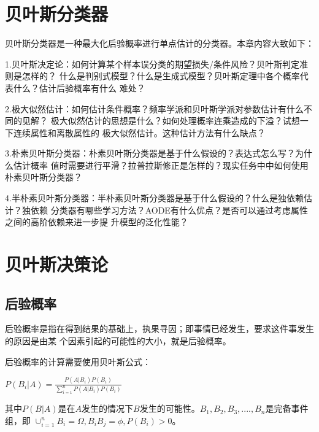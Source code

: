 \documentclass[UTF8]{ctexart}
\begin{document}
\newpage
\tableofcontents
\newpage
\Large{
\section{贝叶斯分类器}
贝叶斯分类器是一种最大化后验概率进行单点估计的分类器。本章内容大致如下：\par
1.贝叶斯决定论：如何计算某个样本误分类的期望损失/条件风险？贝叶斯判定准则是怎样的？
什么是判别式模型？什么是生成式模型？贝叶斯定理中各个概率代表什么？估计后验概率有什么
难处？\par
2.极大似然估计：如何估计条件概率？频率学派和贝叶斯学派对参数估计有什么不同的见解？
极大似然估计的思想是什么？如何处理概率连乘造成的下溢？试想一下连续属性和离散属性的
极大似然估计。这种估计方法有什么缺点？\par
3.朴素贝叶斯分类器：朴素贝叶斯分类器是基于什么假设的？表达式怎么写？为什么估计概率
值时需要进行平滑？拉普拉斯修正是怎样的？现实任务中中如何使用朴素贝叶斯分类器？\par
4.半朴素贝叶斯分类器：半朴素贝叶斯分类器是基于什么假设的？什么是独依赖估计？独依赖
分类器有哪些学习方法？AODE有什么优点？是否可以通过考虑属性之间的高阶依赖来进一步提
升模型的泛化性能？\newpage
\section{贝叶斯决策论}
\subsection{后验概率}
后验概率是指在得到结果的基础上，执果寻因；即事情已经发生，要求这件事发生的原因是由某
个因素引起的可能性的大小，就是后验概率。\par
后验概率的计算需要使用贝叶斯公式：
\begin{center}
    \Large{
        $P(B_i|A)=\frac{P(A|B_i)P(B_i)}{\sum_{i=1}^nP(A|B_i)P(B_i)}$\\[2ex]
    }
\end{center}
其中$P(B|A)$是在$A$发生的情况下$B$发生的可能性。$B_1,B_2,B_3,....,B_n$是完备事件组，即
$\cup_{i=1}^nB_i=\Omega,B_iB_j=\phi,P(B_i)>0$。
}
\end{document}
